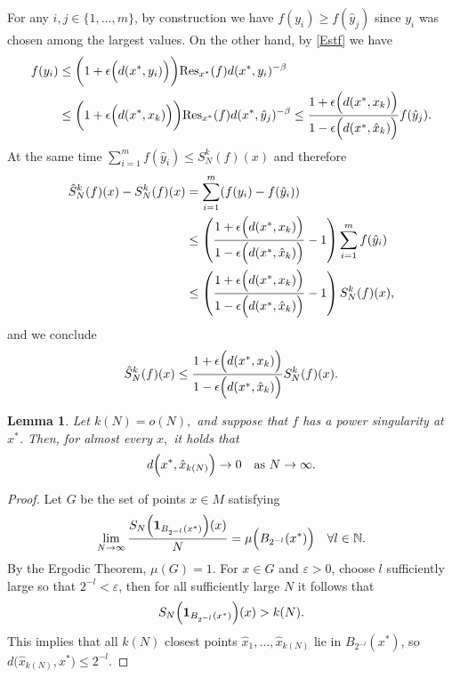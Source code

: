 \documentclass[11pt,twoside,a4paper,reqno]{amsart}
\newtheorem{lemma}[theorem]{Lemma}
\newcommand{\as}[1]{\text{as } #1 \rightarrow\infty}
\newcommand{\N}{\mathbb{N}}
\def\one{{\mathbf{1}}}
\begin{document}
For any $i,j\in\{1,\dots,m\}$, by construction we have $f(y_i)\geq f(\hat{y}_j)$ since $y_i$ was chosen among the largest values. On the other hand, by \eqref{Estf} we have
\begin{align*}
f(y_i) &\leq \biggl(1+\epsilon\Bigl(d(x^*, y_i)\Bigr)\biggr) \mathrm{Res}_{x^*}(f)d(x^*, y_i)^{-\beta} \\
& \leq\biggl(1+\epsilon\Bigl(d(x^*,x_k)\Bigr)\biggr) \mathrm{Res}_{x^*}(f)d(x^*, \hat{y}_j)^{-\beta} \leq \frac{1+\epsilon\Bigl(d(x^*,x_k)\Bigr)}{1-\epsilon\Bigl(d(x^*,\hat{x}_k)\Bigr)} f(\hat{y}_j).
\end{align*}
At the same time $\sum_{i=1}^m f(\hat{y}_i)\leq S_N^k(f)(x)$ and therefore
\begin{align*}
\hat{S}_N^k(f)(x)-S_N^k(f)(x)&=\sum_{i=1}^m (f(y_i)-f(\hat{y}_i))\\
& \leq \left( \frac{1+\epsilon\Bigl(d(x^*,x_k)\Bigr)}{1-\epsilon\Bigl(d(x^*,\hat{x}_k)\Bigr)}-1\right) \sum_{i=1}^m f(\hat{y}_i)\\
&\leq \left(\frac{1+\epsilon\Bigl(d(x^*,x_k)\Bigr)}{1-\epsilon\Bigl(d(x^*,\hat{x}_k)\Bigr)}-1\right) S_N^k(f)(x),
\end{align*}
and we conclude
\begin{equation}\label{hatSineq}
\hat{S}_N^k(f)(x) \leq \frac{1+\epsilon\Bigl(d(x^*,x_k)\Bigl)}{1-\epsilon\Bigl(d(x^*,\hat{x}_k)\Bigl)} S_N^k(f)(x).
\end{equation}


\begin{lemma}\label{hatxklem}
Let $k(N)=o(N),$ and suppose that $f$ has a power singularity at $x^*$. Then, for almost every $x,$ it holds that
\begin{equation*}
d\Bigl(x^*,\hat{x}_{k(N)}\Bigr) \rightarrow 0 \quad \as{N}.
\end{equation*}
\end{lemma}
\begin{proof}
Let $G$ be the set of points $x\in M$ satisfying
\begin{equation*}
\lim_{N\rightarrow\infty} \frac{S_N\Bigl(\one_{B_{2^{-l}}(x^*)}\Bigr)(x)}{N} = \mu\Bigl(B_{2^{-l}}(x^*)\Bigr) \quad \forall l\in\N.
\end{equation*}
By the Ergodic Theorem, $\mu(G)=1$. For $x\in G$ and $\varepsilon>0$, choose $l$ sufficiently large so that $2^{-l} < \varepsilon$, then for all sufficiently large $N$ it follows that
\begin{equation*}
S_N\Bigl(\one_{B_{2^{-l}}(x^*)}\Bigr)(x) > k(N).
\end{equation*}
This implies that all $k(N)$ closest points $\hat{x}_1,\dots,\hat{x}_{k(N)}$ lie in $B_{2^{-l}}(x^*)$, so $d\bigl(\hat{x}_{k(N)},x^*\bigr) \leq 2^{-l}$.
\end{proof}
\end{document}
